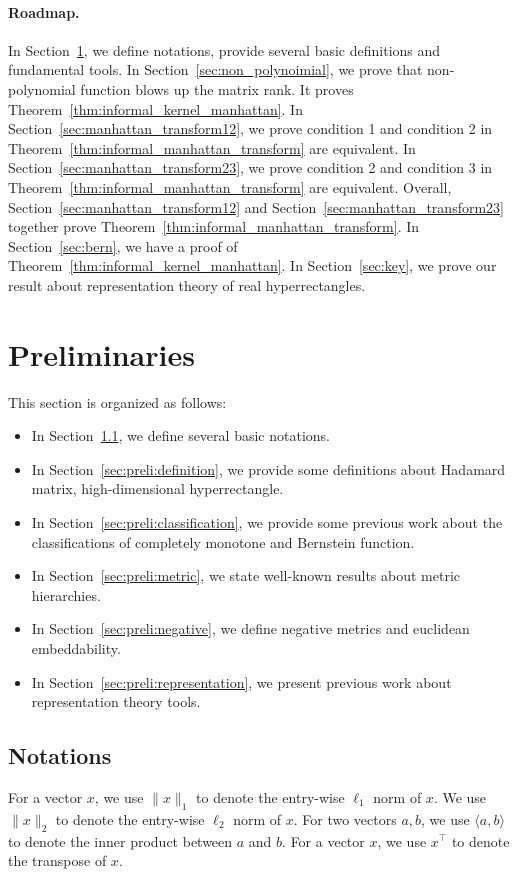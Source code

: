 
\paragraph{Roadmap.}
In Section~\ref{sec:preli}, we define notations, provide several basic definitions and fundamental tools. In Section~\ref{sec:non_polynoimial}, we prove that non-polynomial function blows up the matrix rank. It proves Theorem~\ref{thm:informal_kernel_manhattan}. In Section~\ref{sec:manhattan_transform12}, we prove condition 1 and condition 2 in Theorem~\ref{thm:informal_manhattan_transform} are equivalent. In Section~\ref{sec:manhattan_transform23}, we prove condition 2 and condition 3 in Theorem~\ref{thm:informal_manhattan_transform} are equivalent. Overall, Section~\ref{sec:manhattan_transform12} and Section~\ref{sec:manhattan_transform23} together prove Theorem~\ref{thm:informal_manhattan_transform}. In Section~\ref{sec:bern}, we have a proof of Theorem~\ref{thm:informal_kernel_manhattan}.
In Section~\ref{sec:key}, we prove our result about representation theory of real hyperrectangles.

\section{Preliminaries}\label{sec:preli}



This section is organized as follows:

\begin{itemize}
    \item In Section~\ref{sec:preli:notation}, we define several basic notations.
    \item In Section~\ref{sec:preli:definition}, we provide some definitions about Hadamard matrix, high-dimensional hyperrectangle.
    \item In Section~\ref{sec:preli:classification}, we provide some previous work about the classifications of completely monotone and Bernstein function.
    \item In Section~\ref{sec:preli:metric}, we state well-known results about metric hierarchies.
    \item In Section~\ref{sec:preli:negative}, we define negative metrics and euclidean embeddability.
    \item In Section~\ref{sec:preli:representation}, we present previous work about representation theory tools.
\end{itemize}

\subsection{Notations}\label{sec:preli:notation}
For a vector $x$, we use $\| x \|_1$ to denote the entry-wise $\ell_1$ norm of $x$. We use $\| x \|_2$ to denote the entry-wise $\ell_2$ norm of $x$. For two vectors $a,b$, we use $\langle a, b \rangle$ to denote the inner product between $a$ and $b$. For a vector $x$, we use $x^\top$ to denote the transpose of $x$.

